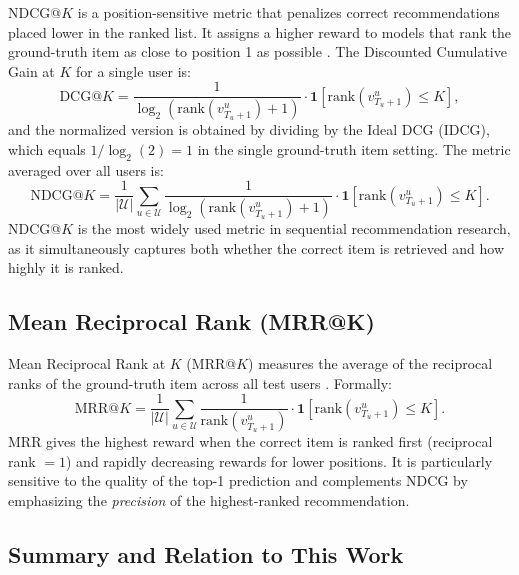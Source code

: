 \documentclass[12pt,a4paper]{report}
\newcommand{\parencite}[1]{\citep{#1}}
\begin{document}
NDCG@$K$ is a position-sensitive metric that penalizes correct
recommendations placed lower in the ranked list. It assigns a
higher reward to models that rank the ground-truth item as close
to position 1 as possible \parencite{wang2019sequential}. The
Discounted Cumulative Gain at $K$ for a single user is:
\begin{equation}
  \text{DCG@}K =
    \frac{1}{\log_2(\text{rank}(v_{T_u+1}^u) + 1)}
    \cdot \mathbf{1}\!\left[ \text{rank}(v_{T_u+1}^u) \leq K \right],
\end{equation}
and the normalized version is obtained by dividing by the Ideal
DCG (IDCG), which equals $1 / \log_2(2) = 1$ in the single
ground-truth item setting. The metric averaged over all users is:
\begin{equation}
  \text{NDCG@}K = \frac{1}{|\mathcal{U}|}
    \sum_{u \in \mathcal{U}}
    \frac{1}{\log_2\!\left(\text{rank}(v_{T_u+1}^u) + 1\right)}
    \cdot \mathbf{1}\!\left[ \text{rank}(v_{T_u+1}^u) \leq K \right].
\end{equation}
NDCG@$K$ is the most widely used metric in sequential
recommendation research, as it simultaneously captures both
whether the correct item is retrieved and how highly it is ranked.

\subsection{Mean Reciprocal Rank (MRR@K)}

Mean Reciprocal Rank at $K$ (MRR@$K$) measures the average of
the reciprocal ranks of the ground-truth item across all test
users \parencite{hidasi2016gru4rec}. Formally:
\begin{equation}
  \text{MRR@}K = \frac{1}{|\mathcal{U}|}
    \sum_{u \in \mathcal{U}}
    \frac{1}{\text{rank}(v_{T_u+1}^u)}
    \cdot \mathbf{1}\!\left[ \text{rank}(v_{T_u+1}^u) \leq K \right].
\end{equation}
MRR gives the highest reward when the correct item is ranked first
(reciprocal rank $= 1$) and rapidly decreasing rewards for lower
positions. It is particularly sensitive to the quality of the
top-1 prediction and complements NDCG by emphasizing the
\textit{precision} of the highest-ranked recommendation.

\subsection{Summary and Relation to This Work}
\end{document}
